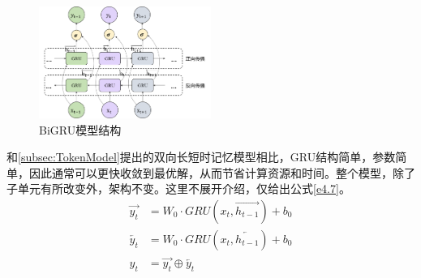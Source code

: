 \begin{figure}[H]
  \centering
  \includegraphics[width=0.5\textwidth]{figures/BiGRU.png}
  \caption{BiGRU模型结构}\label{fig:BiGRU}
\end{figure}

和\ref{subsec:TokenModel}提出的双向长短时记忆模型相比，GRU结构简单，参数简单，因此通常可以更快收敛到最优解，从而节省计算资源和时间。整个模型，除了子单元有所改变外，架构不变。这里不展开介绍，仅给出公式\ref{e4.7}。
\begin{equation}\label{e4.7}
  \begin{split}
    \overrightarrow{y_t} &= W_0 \cdot GRU\left(x_{t},\overrightarrow{h_{t-1}}\right) + b_0
    \\
    \overleftarrow{y_t} &= W_0 \cdot GRU\left(x_{t},\overleftarrow{h_{t-1}}\right) + b_0
    \\
    y_t &= \overrightarrow{y_t} \oplus\overleftarrow{y_t}
  \end{split}
\end{equation}


